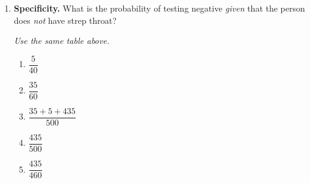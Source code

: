 \documentclass{article}
\begin{document}
\begin{enumerate}[label=\textbf{S\arabic*.}]
\item \textbf{Specificity.} What is the probability of testing negative
\emph{given} that the person does \emph{not} have strep throat? 

\textit{Use the same table above.}

\begin{enumerate}
  \item $\dfrac{5}{40}$
  \item $\dfrac{35}{60}$
  \item $\dfrac{35+5+435}{500}$
  \item $\dfrac{435}{500}$
  \item $\dfrac{435}{460}$
\end{enumerate}

\end{enumerate}
\end{document}
